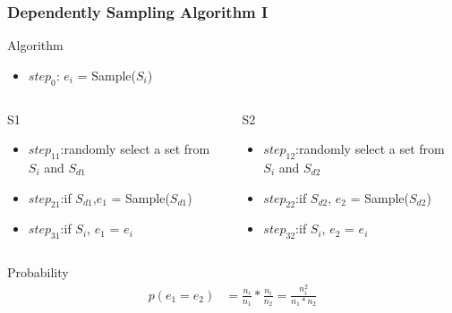 \documentclass[notheorems, aspectratio=54]{beamer}
\begin{document}
\begin{frame}
    \frametitle{Dependently Sampling Algorithm I}
    \begin{block}{Algorithm}
        \begin{itemize}
            \item $step_{0}$: $e_i$ = Sample($S_i$)
        \end{itemize}
        \begin{columns}
        \begin{column}{0.5\textwidth}
            \begin{alertblock}{S1}
                \begin{itemize}
                    \item $step_{11}$:randomly select a set from $S_i$ and $S_{d1}$
                    \item $step_{21}$:if $S_{d1}$,$e_1$ = Sample($S_{d1}$)
                    \item $step_{31}$:if $S_i$, $e_1$ = $e_i$
                \end{itemize}
            \end{alertblock}
            \end{column}
            \begin{column}{0.5\textwidth}
            \begin{alertblock}{S2}
                \begin{itemize}
                    \item $step_{12}$:randomly select a set from $S_i$ and $S_{d2}$
                    \item $step_{22}$:if $S_{d2}$, $e_2$ = Sample($S_{d2}$)
                    \item $step_{32}$:if $S_i$, $e_2$ = $e_i$
                \end{itemize}
            \end{alertblock}
            \end{column}
        \end{columns}
    \end{block}

    \begin{block}{Probability}
        \begin{equation}
            \begin{aligned}
                p(e_1 = e_2) &=  \frac{n_i}{n_1}*\frac{n_i}{n_2} = \frac{n_i^2}{n_1*n_2}
            \end{aligned}
        \end{equation}
    \end{block}
\end{frame}
\end{document}
